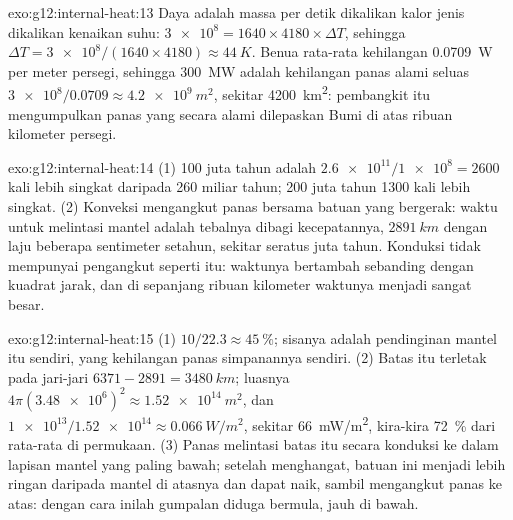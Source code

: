 \begin{solution}{exo:g12:internal-heat:13}
Daya adalah massa per detik dikalikan kalor jenis dikalikan kenaikan suhu:
$\num{3e8} = 1640 \times 4180 \times \Delta T$, sehingga $\Delta T =
\num{3e8}/(1640 \times 4180) \approx \qty{44}{K}$. Benua rata-rata kehilangan
\qty{0.0709}{W} per meter persegi, sehingga \qty{300}{MW} adalah kehilangan
panas alami seluas $\num{3e8}/0.0709 \approx \qty{4.2e9}{m^2}$, sekitar
\qty{4200}{km^2}: pembangkit itu mengumpulkan panas yang secara alami dilepaskan
Bumi di atas ribuan kilometer persegi.
\end{solution}

\begin{solution}{exo:g12:internal-heat:14}
(1) 100 juta tahun adalah $\num{2.6e11}/\num{1e8} = 2600$ kali lebih singkat
daripada 260 miliar tahun; 200 juta tahun 1300 kali lebih singkat.
(2) Konveksi mengangkut panas bersama batuan yang bergerak: waktu untuk
melintasi mantel adalah tebalnya dibagi kecepatannya, $\qty{2891}{km}$ dengan
laju beberapa sentimeter setahun, sekitar seratus juta tahun. Konduksi tidak
mempunyai pengangkut seperti itu: waktunya bertambah sebanding dengan kuadrat
jarak, dan di sepanjang ribuan kilometer waktunya menjadi sangat besar.
\end{solution}

\begin{solution}{exo:g12:internal-heat:15}
(1) $10/22.3 \approx \qty{45}{\percent}$; sisanya adalah pendinginan mantel
itu sendiri, yang kehilangan panas simpanannya sendiri. (2) Batas itu terletak pada jari-jari $6371 - 2891 =
\qty{3480}{km}$; luasnya $4\pi (\num{3.48e6})^2 \approx
\qty{1.52e14}{m^2}$, dan $\num{1e13}/\num{1.52e14} \approx
\qty{0.066}{W/m^2}$, sekitar \qty{66}{mW/m^2}, kira-kira \qty{72}{\percent}
dari rata-rata di permukaan. (3) Panas melintasi batas itu secara konduksi ke
dalam lapisan mantel yang paling bawah; setelah menghangat, batuan ini menjadi
lebih ringan daripada mantel di atasnya dan dapat naik, sambil mengangkut panas
ke atas: dengan cara inilah gumpalan diduga bermula, jauh di bawah.
\end{solution}


